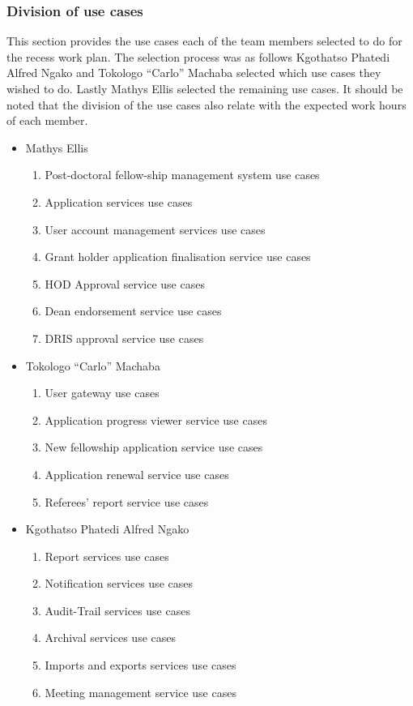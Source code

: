 \documentclass[12pt]{article}
\begin{document}
\subsubsection{Division of use cases}
This section provides the use cases each of the team members selected to do for the recess work plan. The selection process was as follows Kgothatso Phatedi Alfred Ngako and Tokologo “Carlo” Machaba selected which use cases they wished to do. Lastly Mathys Ellis selected the remaining use cases. It should be noted that the division of the use cases also relate with the expected work hours of each member.
\begin{itemize}
	\item Mathys Ellis
	\begin{enumerate}
		\item Post-doctoral fellow-ship management system use cases
		\item Application services use cases
		\item User account management services use cases
		\item Grant holder application finalisation service use cases
		\item HOD Approval service use cases
		\item Dean endorsement service use cases
		\item DRIS approval service use cases
	\end{enumerate}
	\item Tokologo “Carlo” Machaba
	\begin{enumerate}
		\item User gateway use cases
		\item Application progress viewer service use cases
		\item New fellowship application service use cases
		\item Application renewal service use cases
		\item Referees' report service use cases
	\end{enumerate}
	\item Kgothatso Phatedi Alfred Ngako
	\begin{enumerate}
		\item Report services use cases
		\item Notification services use cases
		\item Audit-Trail services use cases
		\item Archival services use cases
		\item Imports and exports services use cases
		\item Meeting management service use cases
	\end{enumerate}
\end{itemize}
\end{document}
